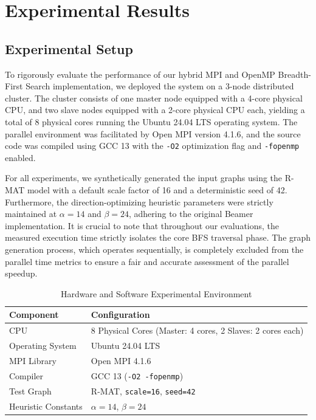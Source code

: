 \section{Experimental Results}

\subsection{Experimental Setup}
To rigorously evaluate the performance of our hybrid MPI and OpenMP Breadth-First Search implementation, we deployed the system on a 3-node distributed cluster. The cluster consists of one master node equipped with a 4-core physical CPU, and two slave nodes equipped with a 2-core physical CPU each, yielding a total of 8 physical cores running the Ubuntu 24.04 LTS operating system. The parallel environment was facilitated by Open MPI version 4.1.6, and the source code was compiled using GCC 13 with the \texttt{-O2} optimization flag and \texttt{-fopenmp} enabled. 

For all experiments, we synthetically generated the input graphs using the R-MAT model with a default scale factor of 16 and a deterministic seed of 42. Furthermore, the direction-optimizing heuristic parameters were strictly maintained at $\alpha = 14$ and $\beta = 24$, adhering to the original Beamer implementation. It is crucial to note that throughout our evaluations, the measured execution time strictly isolates the core BFS traversal phase. The graph generation process, which operates sequentially, is completely excluded from the parallel time metrics to ensure a fair and accurate assessment of the parallel speedup.

\begin{table}[H]
\centering
\caption{Hardware and Software Experimental Environment}
\label{tab:env}
\begin{tabular}{ll}
\toprule
\textbf{Component} & \textbf{Configuration} \\
\midrule
CPU                 & 8 Physical Cores (Master: 4 cores, 2 Slaves: 2 cores each) \\
Operating System    & Ubuntu 24.04 LTS \\
MPI Library         & Open MPI 4.1.6 \\
Compiler            & GCC 13 (\texttt{-O2 -fopenmp}) \\
Test Graph          & R-MAT, \texttt{scale=16}, \texttt{seed=42} \\
Heuristic Constants & $\alpha = 14$, $\beta = 24$ \\
\bottomrule
\end{tabular}
\end{table}


